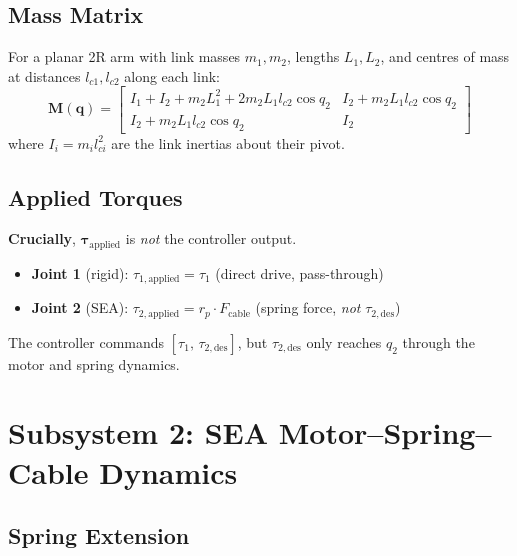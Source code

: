 \documentclass[11pt, a4paper]{article}
\newcommand{\bq}{\bm{q}}
\newcommand{\btau}{\bm{\tau}}
\newcommand{\bM}{\bm{M}}
\begin{document}
\subsection{Mass Matrix}

For a planar 2R arm with link masses $m_1, m_2$, lengths $L_1, L_2$,
and centres of mass at distances $l_{c1}, l_{c2}$ along each link:
\begin{equation}
\label{eq:mass-matrix}
\bM(\bq) =
\begin{bmatrix}
I_1 + I_2 + m_2 L_1^2 + 2 m_2 L_1 l_{c2} \cos q_2
  & I_2 + m_2 L_1 l_{c2} \cos q_2 \\
I_2 + m_2 L_1 l_{c2} \cos q_2
  & I_2
\end{bmatrix}
\end{equation}
where $I_i = m_i l_{ci}^2$ are the link inertias about their pivot.


\subsection{Applied Torques}

\begin{mdframed}
\textbf{Crucially}, $\btau_\text{applied}$ is \emph{not} the controller output.
\begin{itemize}
\item \textbf{Joint 1} (rigid): $\tau_{1,\text{applied}} = \tau_1$ \quad (direct drive, pass-through)
\item \textbf{Joint 2} (SEA):   $\tau_{2,\text{applied}} = r_p \cdot F_\text{cable}$
      \quad (spring force, \emph{not} $\tau_{2,\text{des}}$)
\end{itemize}
The controller commands $[\tau_1,\, \tau_{2,\text{des}}]$, but
$\tau_{2,\text{des}}$ only reaches $q_2$ through the motor and spring dynamics.
\end{mdframed}


\section{Subsystem 2: SEA Motor--Spring--Cable Dynamics}
\label{sec:sea}

\subsection{Spring Extension}
\end{document}
